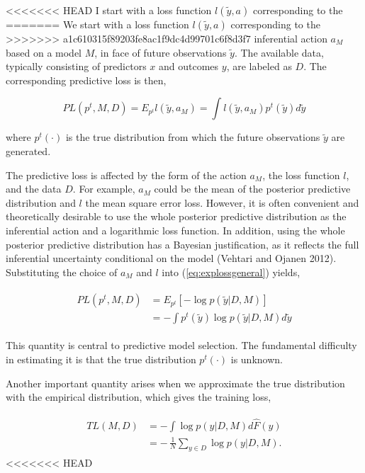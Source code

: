 \documentclass[11pt,article,oneside]{memoir}
\begin{document}
<<<<<<< HEAD
I start with a loss function \(l(\tilde y, a)\) corresponding to the
=======
We start with a loss function \(l(\tilde y, a)\) corresponding to the
>>>>>>> a1c610315f89203fe8ac1f9dc4d99701c6f8d3f7
inferential action \(a_M\) based on a model \(M\), in face of future
observations \(\tilde y\). The available data, typically consisting of
predictors \(x\) and outcomes \(y\), are labeled as \(D\). The
corresponding predictive loss is then,

\begin{equation}
\label{eq:explossgeneral}
PL(p^t, M, D)=E_{p^t}l(\tilde y,
a_M)=\int l(\tilde y, a_M) p^t(\tilde y)d\tilde y
\end{equation}

\noindent where \(p^t(\cdot)\) is the true distribution from which the
future observations \(\tilde y\) are generated.

The predictive loss is affected by the form of the action \(a_M\), the
loss function \(l\), and the data \(D\). For example, \(a_M\) could be
the mean of the posterior predictive distribution and \(l\) the mean
square error loss. However, it is often convenient and theoretically
desirable to use the whole posterior predictive distribution as the
inferential action and a logarithmic loss function. In addition, using
the whole posterior predictive distribution has a Bayesian
justification, as it reflects the full inferential uncertainty
conditional on the model (Vehtari and Ojanen 2012). Substituting the
choice of \(a_M\) and \(l\) into (\ref{eq:explossgeneral}) yields,

\begin{align}
  \begin{split}
  \label{eq:logloss}
  PL(p^t, M, D)&=E_{p^t}[-\log p(\tilde y|D, M)]\\ 
  &=-\int p^t(\tilde y) \log p(\tilde y|D, M) d\tilde y
  \end{split}
  \end{align}

\noindent This quantity is central to predictive model selection. The
fundamental difficulty in estimating it is that the true distribution
\(p^t(\cdot)\) is unknown.

Another important quantity arises when we approximate the true
distribution with the empirical distribution, which gives the training
loss,

\begin{align}
  \begin{split}
  \label{eq:trloss}
  TL(M, D)&=-\int \log p(y|D, M) d\hat{F}(y)\\
  &=-\,\frac{1}{N}\sum_{y\in D}\log p(y | D, M).
  \end{split}
\end{align}
<<<<<<< HEAD
\end{document}
